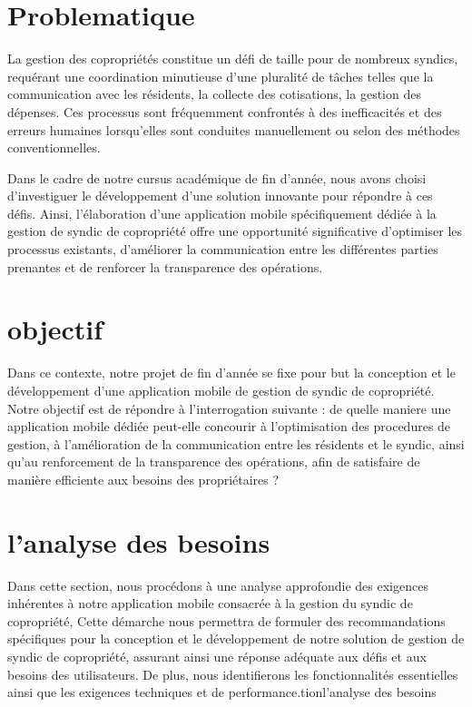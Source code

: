\section{Problematique}
La gestion des copropriétés constitue un défi de taille pour de nombreux syndics, requérant une coordination minutieuse d'une pluralité de tâches telles que la communication avec les résidents, la collecte des cotisations, la gestion des dépenses. Ces processus sont fréquemment confrontés à des inefficacités et des erreurs humaines lorsqu'elles sont conduites manuellement ou selon des méthodes conventionnelles.

Dans le cadre de notre cursus académique de fin d'année, nous avons choisi d'investiguer le développement d'une solution innovante pour répondre à ces défis. Ainsi, l'élaboration d'une application mobile spécifiquement  dédiée à la gestion de syndic de copropriété offre une opportunité significative d'optimiser les processus existants, d'améliorer la communication entre les différentes parties prenantes et de renforcer la transparence des opérations.
\section{objectif}
Dans ce contexte, notre projet de fin d'année se fixe pour but  la conception et le développement d'une application mobile de gestion de syndic de copropriété. Notre objectif est de répondre à l'interrogation suivante :
de quelle maniere une application mobile dédiée peut-elle concourir à l'optimisation des procedures de gestion, à l'amélioration de la communication entre les résidents et le syndic, ainsi qu'au renforcement de la transparence des opérations, afin de satisfaire de manière efficiente aux besoins des propriétaires ?

\section{l'analyse des besoins}
Dans cette section, nous procédons à une analyse approfondie des exigences inhérentes à notre application mobile consacrée à la gestion du syndic de copropriété, Cette démarche nous permettra de formuler des recommandations spécifiques pour la conception et le développement de notre solution de gestion de syndic de copropriété, assurant ainsi une réponse adéquate aux défis et aux besoins des utilisateurs. De plus, nous identifierons les fonctionnalités essentielles ainsi que les exigences techniques et de performance.tion{l'analyse des besoins}

